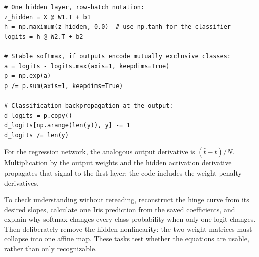 \begin{lstlisting}
# One hidden layer, row-batch notation:
z_hidden = X @ W1.T + b1
h = np.maximum(z_hidden, 0.0)  # use np.tanh for the classifier
logits = h @ W2.T + b2

# Stable softmax, if outputs encode mutually exclusive classes:
a = logits - logits.max(axis=1, keepdims=True)
p = np.exp(a)
p /= p.sum(axis=1, keepdims=True)

# Classification backpropagation at the output:
d_logits = p.copy()
d_logits[np.arange(len(y)), y] -= 1
d_logits /= len(y)
\end{lstlisting}
For the regression network, the analogous output derivative is $(\hat t-t)/N$. Multiplication by the output weights and the hidden activation derivative propagates that signal to the first layer; the code includes the weight-penalty derivatives.

To check understanding without rereading, reconstruct the hinge curve from its desired slopes, calculate one Iris prediction from the saved coefficients, and explain why softmax changes every class probability when only one logit changes. Then deliberately remove the hidden nonlinearity: the two weight matrices must collapse into one affine map. These tasks test whether the equations are usable, rather than only recognizable.
